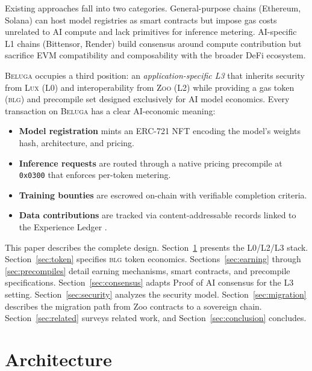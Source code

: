 \documentclass[11pt,letterpaper]{article}
\newcommand{\Zoo}{\textsc{Zoo}}
\newcommand{\Lux}{\textsc{Lux}}
\newcommand{\Beluga}{\textsc{Beluga}}
\newcommand{\BLG}{\textsc{blg}}
\begin{document}
Existing approaches fall into two categories. General-purpose chains (Ethereum, Solana) can host model registries as smart contracts but impose gas costs unrelated to AI compute and lack primitives for inference metering. AI-specific L1 chains (Bittensor, Render) build consensus around compute contribution but sacrifice EVM compatibility and composability with the broader DeFi ecosystem.

\Beluga{} occupies a third position: an \emph{application-specific L3} that inherits security from \Lux{} (L0) and interoperability from \Zoo{} (L2) while providing a gas token (\BLG{}) and precompile set designed exclusively for AI model economics. Every transaction on \Beluga{} has a clear AI-economic meaning:

\begin{itemize}[nosep]
    \item \textbf{Model registration} mints an ERC-721 NFT encoding the model's weights hash, architecture, and pricing.
    \item \textbf{Inference requests} are routed through a native pricing precompile at \texttt{0x0300} that enforces per-token metering.
    \item \textbf{Training bounties} are escrowed on-chain with verifiable completion criteria.
    \item \textbf{Data contributions} are tracked via content-addressable records linked to the Experience Ledger \cite{zoo-experience-ledger}.
\end{itemize}

This paper describes the complete design. Section~\ref{sec:architecture} presents the L0/L2/L3 stack. Section~\ref{sec:token} specifies \BLG{} token economics. Sections~\ref{sec:earning} through \ref{sec:precompiles} detail earning mechanisms, smart contracts, and precompile specifications. Section~\ref{sec:consensus} adapts Proof of AI consensus for the L3 setting. Section~\ref{sec:security} analyzes the security model. Section~\ref{sec:migration} describes the migration path from Zoo contracts to a sovereign chain. Section~\ref{sec:related} surveys related work, and Section~\ref{sec:conclusion} concludes.

\section{Architecture}\label{sec:architecture}
\end{document}
